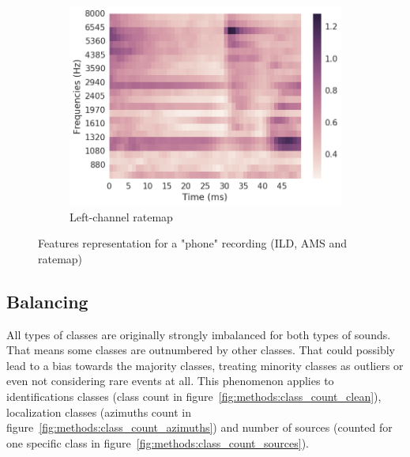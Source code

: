 \begin{figure}[htb]
\begin{subfigure}[t]{0.3\textwidth}
	\includegraphics[scale=0.3,valign=t]{images-data/rmp}
	\caption{Left-channel ratemap}
	\label{fig:methods:rmp}
\end{subfigure}
\caption{Features representation for a "phone" recording (ILD, AMS and ratemap)}
\end{figure}

\subsection{Balancing}
\label{sec:methods:balancing}

All types of classes are originally strongly imbalanced for both types of sounds. That means some classes are outnumbered by other classes. That could possibly lead to a bias towards the majority classes, treating minority classes as outliers or even not considering rare events at all. This phenomenon applies to identifications classes (class count in figure~\ref{fig:methods:class_count_clean}), localization classes (azimuths count in figure~\ref{fig:methods:class_count_azimuths}) and number of sources (counted for one specific class in figure~\ref{fig:methods:class_count_sources}).

